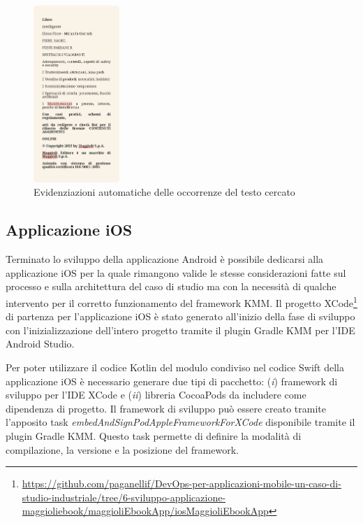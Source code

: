 \begin{multicols}{3}
            \begin{figure}[H]
                \centering
                \includegraphics[width=0.29\textwidth]{img/ricerca_testo2.png}
                \caption{Evidenziazioni automatiche delle occorrenze del testo cercato}
                \label{ricerca_testo2-android}
            \end{figure}
\end{multicols}

\subsection{Applicazione iOS}
Terminato lo sviluppo della applicazione Android è possibile dedicarsi alla applicazione iOS per la quale rimangono valide le stesse considerazioni fatte sul processo e sulla architettura del caso di studio ma con la necessità di qualche intervento per il corretto funzionamento del framework KMM. Il progetto XCode\footnote{\href{https://github.com/paganellif/DevOps-per-applicazioni-mobile-un-caso-di-studio-industriale/tree/6-sviluppo-applicazione-maggioliebook/maggioliEbookApp/iosMaggioliEbookApp}{https://github.com/paganellif/DevOps-per-applicazioni-mobile-un-caso-di-studio-industriale/tree/6-sviluppo-applicazione-maggioliebook/maggioliEbookApp/iosMaggioliEbookApp}} di partenza per l'applicazione iOS è stato generato all'inizio della fase di sviluppo con l'inizializzazione dell'intero progetto tramite il plugin Gradle KMM per l'IDE Android Studio.

Per poter utilizzare il codice Kotlin del modulo condiviso nel codice Swift della applicazione iOS è necessario generare due tipi di pacchetto: (\textit{i}) framework di sviluppo per l'IDE XCode e (\textit{ii}) libreria CocoaPods da includere come dipendenza di progetto. Il framework di sviluppo può essere creato tramite l'apposito task \textit{embedAndSignPodAppleFrameworkForXCode} disponibile tramite il plugin Gradle KMM. Questo task permette di definire la modalità di compilazione, la versione e la posizione del framework.

